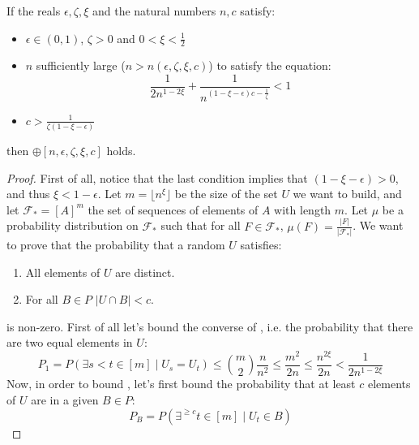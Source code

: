     \begin{lemma}[Lemma 4.19] \label{lem:n_large_enough_valid_values}
        If the reals $\epsilon, \zeta, \xi$ and the natural numbers $n, c$ satisfy:
        \begin{itemize}
            \item $\epsilon \in (0,1)$, $\zeta > 0$ and $0 < \xi < \frac{1}{2}$
            \item $n$ sufficiently large ($n > n(\epsilon, \zeta, \xi, c)$) to satisfy the equation:
            \[
                \frac{1}{2n^{1-2\xi}} + \frac{1}{n^{(1 - \xi - \epsilon)c - \frac{1}{\zeta}}} < 1
            \]
            \item $c > \frac{1}{\zeta (1 - \xi - \epsilon)}$
        \end{itemize}
        then $\oplus[n, \epsilon, \zeta, \xi, c]$ holds.
        \begin{proof}
            First of all, notice that the last condition implies that $(1 - \xi - \epsilon) > 0$, and thus $\xi < 1 -\epsilon$.
            Let $m = \lfloor n^\xi \rfloor$ be the size of the set $U$ we want to build, and let $\mathcal{F}_* = [A]^m$
            the set of sequences of elements of $A$ with length $m$.
            Let $\mu$ be a probability distribution on $\mathcal{F}_*$ such that for all $F \in \mathcal{F}_*$,
            $\mu(F) = \frac{|F|}{|\mathcal{F}_*|}$.
            We want to prove that the probability that a random $U$ satisfies:
            \begin{enumerate}
                \item\label{itm:n_large_enough_valid_values.1} All elements of $U$ are distinct.
                \item\label{itm:n_large_enough_valid_values.2} For all $B \in P$ $|U \cap B| < c$.
            \end{enumerate}
            is non-zero.
            First of all let's bound the converse of , i.e. the probability that there are two equal elements
            in $U$:
            \[
                P_1 = P(\exists s < t \in [m] \mid U_s = U_t)
                    \leq {m \choose 2} \frac{n}{n^2}
                    \leq \frac{m^2}{2n}
                    \leq \frac{n^{2\xi}}{2n}
                    < \frac{1}{2n^{1-2\xi}}
            \]
            Now, in order to bound , let's first bound the probability that at least $c$ elements of
            $U$ are in a given $B \in P$:
            \[
                P_B = P(\exists^{\geq c} t\in [m] \mid U_t \in B)
\]
\end{proof}
\end{lemma}
